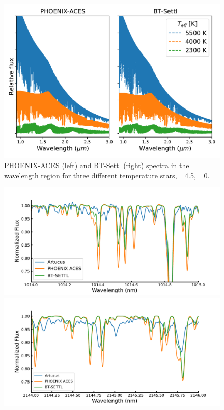  \begin{figure}
    \centering
    \includegraphics[width=0.7\linewidth]{figures/atmos_and_models/phoenix_large_scale_comparision}
    \caption{{PHOENIX-ACES} (left) and {BT-Settl} (right) spectra in the \nir{} wavelength region for three different temperature stars, \logg{}=4.5, \feh{}=0.}
    \label{fig:phoenixlargescalecomparision}
\end{figure}

\begin{figure}
    \centering
    \includegraphics[width=0.45\linewidth]{figures/atmos_and_models/artucus_1micron}     \includegraphics[width=0.45\linewidth]{figures/atmos_and_models/artucus_2micron}
    \caption{}
    \label{fig:artucus1-2micron}
\end{figure}
